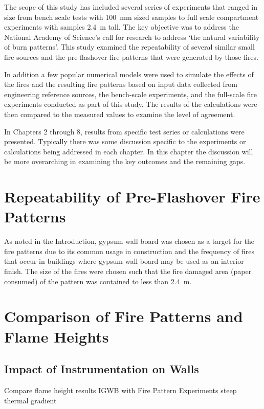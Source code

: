 \documentclass[twoside]{uocthesis}
\begin{document}
{The scope of this study has included several series of experiments that ranged in size from bench scale tests with 100~mm sized samples to full scale compartment experiments with samples 2.4~m tall. The key objective was to address the National Academy of Science's call for research to address `the natural variability of burn patterns'. This study examined the repeatability of several similar small fire sources and the pre-flashover fire patterns that were generated by those fires. 

In addition a few popular numerical models were used to simulate the effects of the fires and the resulting fire patterns based on input data collected from engineering reference sources, the bench-scale experiments, and the full-scale fire experiments conducted as part of this study.  The results of the calculations were then compared to the measured values to examine the level of agreement.  

In Chapters 2 through 8, results from specific test series or calculations were presented.  Typically there was some discussion specific to the experiments or calculations being addressed in each chapter.  In this chapter the discussion will be more overarching in examining the key outcomes and the remaining gaps.   

\section{Repeatability of Pre-Flashover Fire Patterns}

As noted in the Introduction, gypsum wall board was chosen as a target for the fire patterns due to its common usage in construction and the frequency of fires that occur in buildings where gypsum wall board may be used as an interior finish. The size of the fires were chosen such that the fire damaged area (paper consumed) of the pattern was contained to less than 2.4~m.  



\section{Comparison of Fire Patterns and Flame Heights}

\subsection{Impact of Instrumentation on Walls}

Compare flame height results IGWB with Fire Pattern Experiments   steep thermal gradient

}
\end{document}
